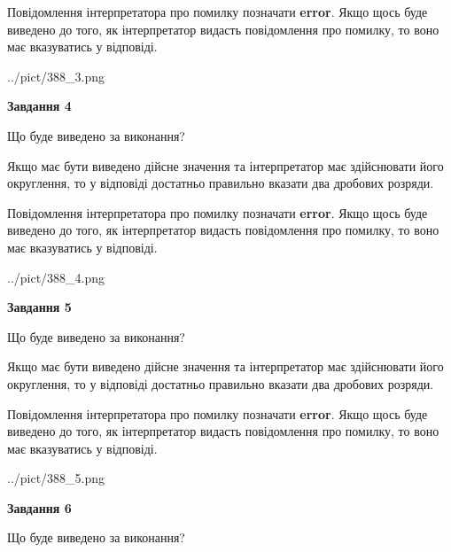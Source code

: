 \documentclass[12pt, ukrainian]{article}
\begin{document}
{\begin {Large}
Повідомлення інтерпретатора про помилку позначати \textbf{error}.
Якщо щось буде виведено до того, як інтерпретатор видасть повідомлення про помилку, 
то воно має вказуватись у відповіді. \par

\begin{center}
	{../pict/388_3.png}
\end{center}
\newpage

{\begin {center}\textbf{Завдання 4}\end {center}}\par
Що буде виведено за виконання? \par

Якщо має бути виведено дійсне значення та інтерпретатор має здійснювати його округлення, 
то у відповіді достатньо правильно вказати два дробових розряди.

Повідомлення інтерпретатора про помилку позначати \textbf{error}.
Якщо щось буде виведено до того, як інтерпретатор видасть повідомлення про помилку, 
то воно має вказуватись у відповіді. \par

\begin{center}
	{../pict/388_4.png}
\end{center}
\newpage

{\begin {center}\textbf{Завдання 5}\end {center}}\par
Що буде виведено за виконання? \par

Якщо має бути виведено дійсне значення та інтерпретатор має здійснювати його округлення, 
то у відповіді достатньо правильно вказати два дробових розряди.

Повідомлення інтерпретатора про помилку позначати \textbf{error}.
Якщо щось буде виведено до того, як інтерпретатор видасть повідомлення про помилку, 
то воно має вказуватись у відповіді. \par

\begin{center}
	{../pict/388_5.png}
\end{center}
\newpage

{\begin {center}\textbf{Завдання 6}\end {center}}\par
Що буде виведено за виконання? \par


\end{Large}}
\end{document}
